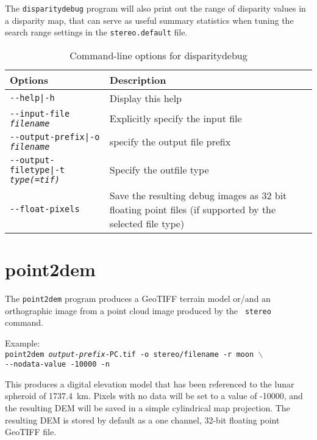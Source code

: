 The {\tt disparitydebug} program will also print out the range of
disparity values in a disparity map, that can serve as useful summary
statistics when tuning the search range settings in the
{\tt stereo.default} file.

\begin{longtable}{|l|p{10cm}|}
\caption{Command-line options for disparitydebug}
\label{tbl:disparitydebug}
\endfirsthead
\endhead
\endfoot
\endlastfoot
\hline
Options & Description \\ \hline \hline
\texttt{-\/-help|-h} & Display this help\\ \hline
\texttt{-\/-input-file \textit{filename}} & Explicitly specify the input file \\ \hline
\texttt{-\/-output-prefix|-o \textit{filename}} & specify the output file prefix \\ \hline
\texttt{-\/-output-filetype|-t \textit{type(=tif)}} & Specify the outfile type \\ \hline
\texttt{-\/-float-pixels} & Save the resulting debug images as 32 bit floating point files (if supported by the selected file type) \\ \hline
\end{longtable}


\section{point2dem}
\label{point2dem}

The \texttt{point2dem} program produces a GeoTIFF terrain model or/and
an orthographic image from a point cloud image produced by the {\tt
  stereo} command.

Example:\\
\hspace*{2em}\texttt{point2dem \textit{output-prefix}-PC.tif -o stereo/filename -r moon $\backslash$} \\
\hspace*{4em}\texttt{-\/-nodata-value -10000 -n}

This produces a digital elevation model that has been referenced to
the lunar spheroid of 1737.4~km.  Pixels with no data will be set to a
value of -10000, and the resulting \ac{DEM} will be saved in a simple
cylindrical map projection.  The resulting \ac{DEM} is stored by default as
a one channel, 32-bit floating point GeoTIFF file.


